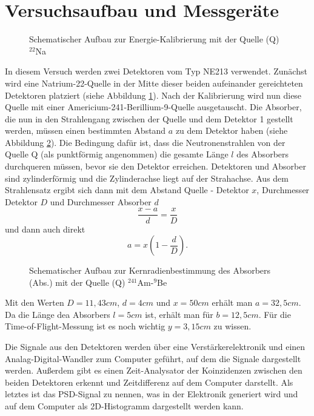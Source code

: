 \section{Versuchsaufbau und Messgeräte}

\begin{figure}[htbp]  
     
  \caption{Schematischer Aufbau zur Energie-Kalibrierung mit der Quelle (Q) $^{22}$Na}
  \label{aufbau1}
\end{figure}

In diesem Versuch werden zwei Detektoren vom Typ NE213 verwendet. Zunächst wird eine Natrium-22-Quelle in der Mitte dieser beiden aufeinander gereichteten Detektoren platziert (siehe Abbildung \ref{aufbau1}). Nach der Kalibrierung wird nun diese Quelle mit einer Americium-241-Berillium-9-Quelle ausgetauscht. Die Absorber, die nun in den Strahlengang zwischen der Quelle und dem Detektor 1 gestellt werden, müssen einen bestimmten Abstand $a$ zu dem Detektor haben (siehe Abbildung \ref{aufbau2}). Die Bedingung dafür ist, dass die Neutronenstrahlen von der Quelle Q (als punktförmig angenommen) die gesamte Länge $l$ des Absorbers durchqueren  müssen, bevor sie den Detektor erreichen. Detektoren und Absorber sind zylinderförmig und die Zylinderachse liegt auf der Strahachse. Aus dem Strahlensatz ergibt sich dann mit dem Abstand Quelle - Detektor $x$, Durchmesser Detektor $D$ und Durchmesser Absorber $d$
\begin{equation}
 \frac{x-a}{d} = \frac{x}{D}
\end{equation}
und dann auch direkt 
\begin{equation}
 a = x\left(1-\frac{d}{D}\right).
\end{equation}

\begin{figure}[htbp]  
     
  \caption{Schematischer Aufbau zur Kernradienbestimmung des Absorbers (Abs.) mit der Quelle (Q) $^{241}$Am-$^9$Be}
  \label{aufbau2}
\end{figure}

Mit den Werten $D=11,43 cm$, $d= 4cm$ und $x=50cm$ erhält man $a=32,5 cm$. Da die Länge dea Absorbers $l=5cm$ ist, erhält man für $b=12,5cm$. Für die Time-of-Flight-Messung ist es noch wichtig $y=3,15cm$ zu wissen.

Die Signale aus den Detektoren werden über eine Verstärkerelektronik und einen Analag-Digital-Wandler zum Computer geführt, auf dem die Signale dargestellt werden. Außerdem gibt es einen Zeit-Analysator der Koinzidenzen zwischen den beiden Detektoren erkennt und Zeitdifferenz auf dem Computer darstellt. Als letztes ist das PSD-Signal zu nennen, was in der Elektronik generiert wird und auf dem Computer als 2D-Histogramm dargestellt werden kann.
